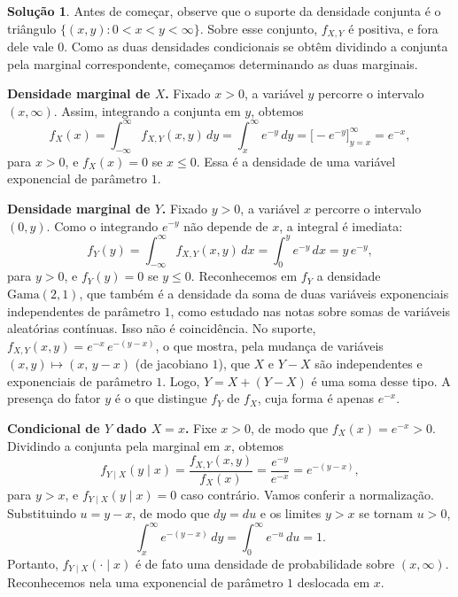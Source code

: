 \documentclass[12pt,portuguese]{article}
\theoremstyle{definition}
\theoremstyle{plainexercise}
\theoremstyle{starredexercise}
\theoremstyle{definition}
\newtheorem*{solution}{Solução}
\begin{document}
\begin{solution}
Antes de começar, observe que o suporte da densidade conjunta é o triângulo
$\{(x,y) : 0 < x < y < \infty\}$. Sobre esse conjunto, $f_{X,Y}$ é positiva, e fora dele
vale $0$. Como as duas densidades condicionais se obtêm dividindo a conjunta pela marginal
correspondente, começamos determinando as duas marginais.

\noindent\textbf{Densidade marginal de $X$.}
Fixado $x > 0$, a variável $y$ percorre o intervalo $(x,\infty)$. Assim, integrando a
conjunta em $y$, obtemos
\begin{equation}
  f_X(x) = \int_{-\infty}^{\infty} f_{X,Y}(x,y)\,dy
  = \int_x^{\infty} e^{-y}\,dy
  = \bigl[-e^{-y}\bigr]_{y=x}^{\infty}
  = e^{-x},
  \label{eq:marginal-x-660}
\end{equation}
para $x > 0$, e $f_X(x) = 0$ se $x \leqslant 0$. Essa é a densidade de uma variável
exponencial de parâmetro $1$.

\noindent\textbf{Densidade marginal de $Y$.}
Fixado $y > 0$, a variável $x$ percorre o intervalo $(0,y)$. Como o integrando $e^{-y}$ não
depende de $x$, a integral é imediata:
\begin{equation}
  f_Y(y) = \int_{-\infty}^{\infty} f_{X,Y}(x,y)\,dx
  = \int_0^{y} e^{-y}\,dx
  = y\,e^{-y},
  \label{eq:marginal-y-660}
\end{equation}
para $y > 0$, e $f_Y(y) = 0$ se $y \leqslant 0$. Reconhecemos em $f_Y$ a densidade
$\mathrm{Gama}(2,1)$, que também é a densidade da soma de duas variáveis exponenciais
independentes de parâmetro $1$, como estudado nas notas sobre somas de variáveis aleatórias
contínuas. Isso não é coincidência. No suporte, $f_{X,Y}(x,y) = e^{-x}\,e^{-(y-x)}$, o que
mostra, pela mudança de variáveis $(x,y) \mapsto (x,\, y-x)$ (de jacobiano $1$), que $X$ e
$Y-X$ são independentes e exponenciais de parâmetro $1$. Logo, $Y = X + (Y-X)$ é uma soma
desse tipo. A presença do fator $y$ é o que distingue $f_Y$ de $f_X$, cuja forma é apenas
$e^{-x}$.

\noindent\textbf{Condicional de $Y$ dado $X = x$.}
Fixe $x > 0$, de modo que $f_X(x) = e^{-x} > 0$. Dividindo a conjunta pela marginal em $x$,
obtemos
\begin{equation}
  f_{Y\mid X}(y \mid x)
  = \frac{f_{X,Y}(x,y)}{f_X(x)}
  = \frac{e^{-y}}{e^{-x}}
  = e^{-(y-x)},
  \label{eq:condicional-y-x-660}
\end{equation}
para $y > x$, e $f_{Y\mid X}(y \mid x) = 0$ caso contrário. Vamos conferir a normalização.
Substituindo $u = y - x$, de modo que $dy = du$ e os limites $y > x$ se tornam $u > 0$,
\[
  \int_x^{\infty} e^{-(y-x)}\,dy
  = \int_0^{\infty} e^{-u}\,du
  = 1.
\]
Portanto, $f_{Y\mid X}(\cdot \mid x)$ é de fato uma densidade de probabilidade sobre
$(x,\infty)$. Reconhecemos nela uma exponencial de parâmetro $1$ deslocada em $x$.


\end{solution}
\end{document}
